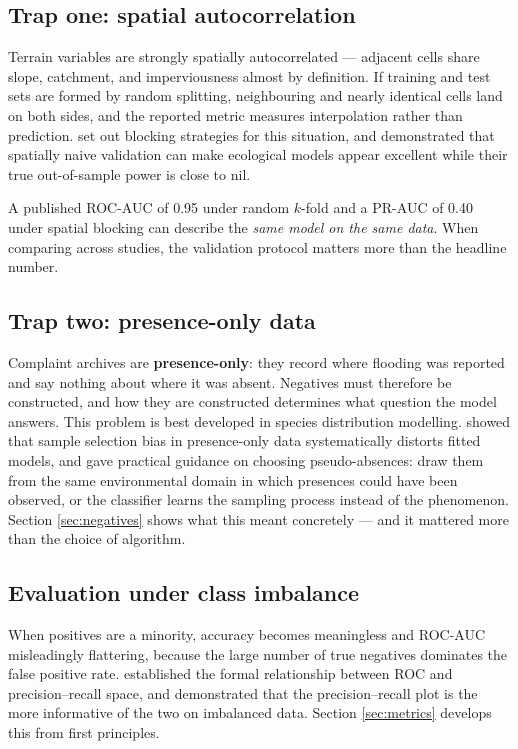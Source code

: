 \documentclass[11pt,a4paper]{article}
\begin{document}
\subsection{Trap one: spatial autocorrelation}
Terrain variables are strongly spatially autocorrelated --- adjacent cells share slope,
catchment, and imperviousness almost by definition. If training and test sets are formed
by random splitting, neighbouring and nearly identical cells land on both sides, and the
reported metric measures interpolation rather than prediction. \citet{roberts2017} set
out blocking strategies for this situation, and \citet{ploton2020} demonstrated that
spatially naive validation can make ecological models appear excellent while their true
out-of-sample power is close to nil.

\begin{trapbox}
A published ROC-AUC of \num{0.95} under random $k$-fold and a PR-AUC of \num{0.40} under
spatial blocking can describe the \emph{same model on the same data}. When comparing
across studies, the validation protocol matters more than the headline number.
\end{trapbox}

\subsection{Trap two: presence-only data}
Complaint archives are \textbf{presence-only}: they record where flooding was reported
and say nothing about where it was absent. Negatives must therefore be constructed, and
how they are constructed determines what question the model answers. This problem is best
developed in species distribution modelling. \citet{phillips2009} showed that sample
selection bias in presence-only data systematically distorts fitted models, and
\citet{barbetmassin2012} gave practical guidance on choosing pseudo-absences: draw them
from the same environmental domain in which presences could have been observed, or the
classifier learns the sampling process instead of the phenomenon. Section
\ref{sec:negatives} shows what this meant concretely --- and it mattered more than the
choice of algorithm.

\subsection{Evaluation under class imbalance}
When positives are a minority, accuracy becomes meaningless and ROC-AUC misleadingly
flattering, because the large number of true negatives dominates the false positive rate.
\citet{davis2006} established the formal relationship between ROC and precision--recall
space, and \citet{saito2015} demonstrated that the precision--recall plot is the more
informative of the two on imbalanced data. Section \ref{sec:metrics} develops this from
first principles.
\end{document}
